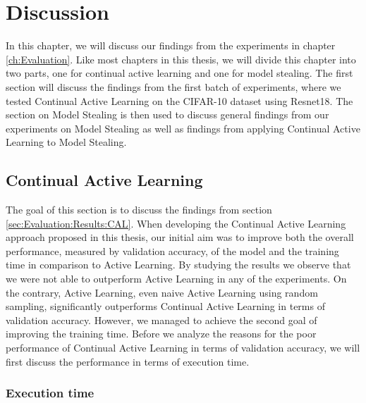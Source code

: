 
\chapter{Discussion}
\label{ch:Discussion}
In this chapter, we will discuss our findings from the experiments in chapter \ref{ch:Evaluation}. Like most chapters in this thesis, we will divide this chapter into two parts, one for continual active learning and one for model stealing. 
The first section will discuss the findings from the first batch of experiments, where we tested Continual Active Learning on the CIFAR-10 dataset using Resnet18. The section on Model Stealing is then used to discuss general findings from
our experiments on Model Stealing as well as findings from applying Continual Active Learning to Model Stealing. 

\section{Continual Active Learning}
\label{sec:Discussion:ContinualActiveLearning}
The goal of this section is to discuss the findings from section \ref{sec:Evaluation:Results:CAL}. When developing the Continual Active Learning approach proposed in this thesis, our initial aim was to improve both the overall performance, measured
by validation accuracy, of the model and the training time in comparison to Active Learning. By studying the results we observe that we were not able to outperform Active Learning in any of the experiments. On the contrary, Active Learning, even naive
Active Learning using random sampling, significantly outperforms Continual Active Learning in terms of validation accuracy. However, we managed to achieve the second goal of improving the training time. Before we analyze the reasons for the poor performance 
of Continual Active Learning in terms of validation accuracy, we will first discuss the performance in terms of execution time.

\subsection{Execution time}
\label{sec:Discussion:ExecutionTime}

